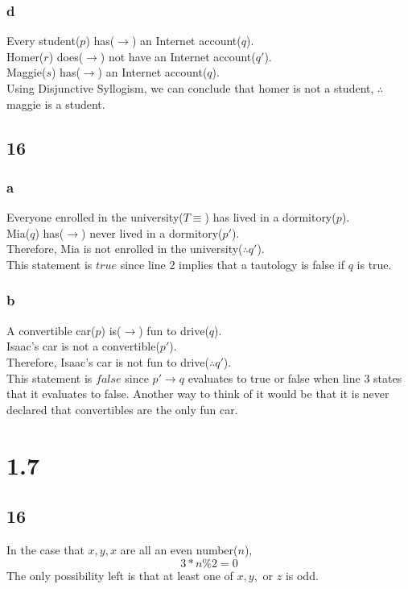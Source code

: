 \documentclass[journal]{IEEEtran}
\begin{document}
		\subsubsection{d}
		Every student($p$) has($\rightarrow$) an Internet account($q$). \\
		Homer($r$) does($\rightarrow$) not have an Internet account($q'$). \\
		Maggie($s$) has($\rightarrow$) an Internet account($q$). \\
		Using Disjunctive Syllogism, we can conclude that homer is not a student, $\therefore$ maggie is a student.

	\subsection*{16}
		\subsubsection{a}
		Everyone enrolled in the university($T \equiv$) has lived in a dormitory($p$). \\
		Mia($q$) has($\rightarrow$) never lived in a dormitory($p'$). \\
		Therefore, Mia is not enrolled in the university($\therefore q'$). \\
		This statement is $\boxed{true}$ since line 2 implies that a tautology is false if $q$ is true.

		\subsubsection{b}
		A convertible car($p$) is($\rightarrow$) fun to drive($q$). \\
		Isaac’s car is not a convertible($p'$). \\
		Therefore, Isaac’s car is not fun to drive($\therefore q'$).\\
		This statement is $\boxed{false}$ since $p' \rightarrow q$ evaluates to 
		true or false when line 3 states that it evaluates to false. Another way to think of it would be 
		that it is never declared that convertibles are the only fun car.

\section*{1.7}
	\subsection*{16}
		In the case that $x,y,x$ are all an even number($n$),
		$$3*n\%2=0$$
		The only possibility left is that at least one of $x,y,$ or $z$ is odd.
\end{document}
